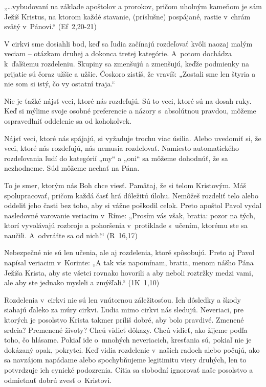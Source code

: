 \def\velkostpisma{9}
\def\velkostriadku{12}




„…vybudovaní na základe apoštolov a prorokov, pričom uholným kameňom je sám Ježiš Kristus, na ktorom každé stavanie, (príslušne) pospájané, rastie v~chrám svätý v~Pánovi.“ (Ef~2,20-21)

V cirkvi sme dosiahli bod, keď sa ľudia začínajú rozdeľovať kvôli naozaj malým veciam -- otázkam druhej a dokonca tretej kategórie. A~potom dochádza k~ďalšiemu rozdeleniu. Skupiny sa zmenšujú a zmenšujú, keďže podmienky na prijatie sú čoraz užšie a užšie. Čoskoro zistíš, že vravíš: „Zostali sme len štyria a nie som si istý, čo vy ostatní traja.“

Nie je ťažké nájsť veci, ktoré nás rozdeľujú. Sú to veci, ktoré sú na dosah ruky. Keď si mýlime svoje osobné preferencie a názory s~absolútnou pravdou, môžeme ospravedlniť oddelenie sa od kohokoľvek.

Nájsť veci, ktoré nás spájajú, si vyžaduje trochu viac úsilia. Alebo uvedomiť si, že veci, ktoré nás rozdeľujú, nás nemusia rozdeľovať. Namiesto automatického rozdeľovania ľudí do kategórií „my“ a „oni“ sa môžeme dohodnúť, že sa nezhodneme. Súd môžeme nechať na Pána.

To je smer, ktorým nás Boh chce viesť. Pamätaj, že si telom Kristovým. Máš spolupracovať, pričom každá časť hrá dôležitú úlohu. Nemôžeš rozdeliť telo alebo oddeliť jeho časti bez toho, aby si vážne poškodil celok. Preto apoštol Pavol vydal nasledovné varovanie veriacim v~Ríme: „Prosím vás však, bratia: pozor na tých, ktorí vyvolávajú rozbroje a pohoršenia v~protiklade s~učením, ktorému ste sa naučili. A~odvráťte sa od nich!“ (R~16,17)

Nebezpečné nie sú len učenia, ale aj rozdelenia, ktoré spôsobujú. Preto aj Pavol napísal veriacim v~Korinte: „A tak vás napomínam, bratia, menom nášho Pána Ježiša Krista, aby ste všetci rovnako hovorili a aby neboli roztržky medzi vami, ale aby ste jednako mysleli a zmýšľali.“ (1K~1,10)

Rozdelenia v~cirkvi nie sú len vnútornou záležitosťou. Ich dôsledky a škody siahajú ďaleko za múry cirkvi. Ľudia mimo cirkvi nás sledujú. Neveriaci, pre ktorých je posolstvo Krista takmer príliš dobré, aby bolo pravdivé. Zmenené srdcia? Premenené životy? Chcú vidieť dôkazy. Chcú vidieť, ako žijeme podľa toho, čo hlásame.
Pokiaľ ide o~mnohých neveriacich, kresťania sú, pokiaľ nie je dokázaný opak, pokrytci. Keď vidia rozdelenie v~našich radoch alebo počujú, ako sa navzájom napádame alebo spochybňujeme legitimitu viery druhých, len to potvrdzuje ich cynické podozrenia. Cítia sa slobodní ignorovať naše posolstvo a odmietnuť dobrú zvesť o~Kristovi.

